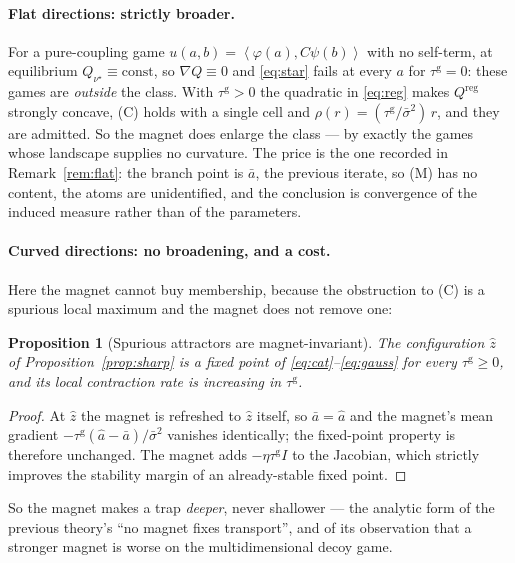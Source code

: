 \documentclass[11pt]{article}
\newtheorem{proposition}{Proposition}
\theoremstyle{definition}
\newcommand{\ip}[2]{\left\langle #1, #2 \right\rangle}
\begin{document}
\paragraph{Flat directions: strictly broader.} For a pure-coupling game
$u(a,b) = \ip{\varphi(a)}{C\psi(b)}$ with no self-term, at equilibrium
$Q_{\nu^\star} \equiv \mathrm{const}$, so $\nabla Q \equiv 0$ and \eqref{eq:star}
fails at every $a$ for $\tau^{\mathrm g} = 0$: these games are \emph{outside} the
class. With $\tau^{\mathrm g} > 0$ the quadratic in \eqref{eq:reg} makes
$Q^{\mathrm{reg}}$ strongly concave, (C) holds with a single cell and
$\rho(r) = (\tau^{\mathrm g}/\bar\sigma^2)\,r$, and they are admitted. So the
magnet does enlarge the class --- by exactly the games whose landscape supplies no
curvature. The price is the one recorded in Remark~\ref{rem:flat}: the branch
point is $\bar a$, the previous iterate, so (M) has no content, the atoms are
unidentified, and the conclusion is convergence of the induced measure rather
than of the parameters.

\paragraph{Curved directions: no broadening, and a cost.} Here the magnet cannot
buy membership, because the obstruction to (C) is a spurious local maximum and
the magnet does not remove one:

\begin{proposition}[Spurious attractors are magnet-invariant]\label{prop:magnetinv}
The configuration $\hat z$ of Proposition~\ref{prop:sharp} is a fixed point of
\eqref{eq:cat}--\eqref{eq:gauss} for \emph{every} $\tau^{\mathrm g} \ge 0$, and
its local contraction rate is \emph{increasing} in $\tau^{\mathrm g}$.
\end{proposition}

\begin{proof}
At $\hat z$ the magnet is refreshed to $\hat z$ itself, so $\bar a = \hat a$ and
the magnet's mean gradient $-\tau^{\mathrm g}(\hat a - \bar a)/\bar\sigma^2$
vanishes identically; the fixed-point property is therefore unchanged. The
magnet adds $-\eta\tau^{\mathrm g}I$ to the Jacobian, which strictly improves the
stability margin of an already-stable fixed point.
\end{proof}

So the magnet makes a trap \emph{deeper}, never shallower --- the analytic form
of the previous theory's ``no magnet fixes transport'', and of its observation
that a stronger magnet is worse on the multidimensional decoy game.
\end{document}

